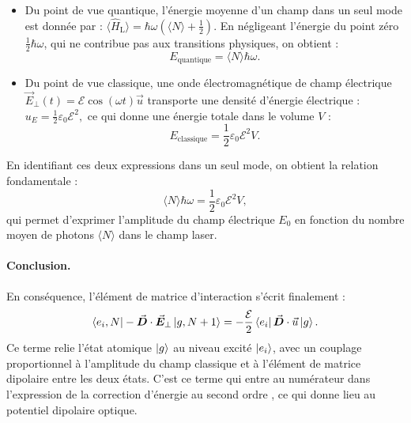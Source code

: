 \begin{itemize}[label = $\bullet$]
  \item Du point de vue quantique, l’énergie moyenne d’un champ dans un seul mode est donnée par :
  \(
  \langle \hat{H}_{\mathrm{L}} \rangle = \hbar \omega \left( \langle N \rangle + \frac{1}{2} \right).
  \)
  En négligeant l’énergie du point zéro \( \frac{1}{2} \hbar \omega \), qui ne contribue pas aux transitions physiques, on obtient :
  \[
  E_{\mathrm{quantique}} = \langle N \rangle \hbar \omega.
  \]

  \item Du point de vue classique, une onde électromagnétique de champ électrique \( \vec{E}_\perp(t) = \mathcal{E} \cos(\omega t) \vec{u} \) transporte une densité d’énergie électrique :
  \(
  u_E = \frac{1}{2} \varepsilon_0\mathcal{E}^2,
  \)
  ce qui donne une énergie totale dans le volume \( V \) :
  \[
  E_{\mathrm{classique}} = \frac{1}{2} \varepsilon_0 \mathcal{E}^2 V.
  \]
\end{itemize}

En identifiant ces deux expressions dans un seul mode, on obtient la relation fondamentale :
\[
\langle N \rangle \hbar \omega = \frac{1}{2} \varepsilon_0 \mathcal{E}^2 V,
\]
qui permet d’exprimer l’amplitude du champ électrique \( E_0 \) en fonction du nombre moyen de photons \( \langle N \rangle \) dans le champ laser.



\paragraph{Conclusion.} En conséquence, l’élément de matrice d’interaction s’écrit finalement :
\[
\bra{e_i, N} - \vec{{\bm{D}}} \cdot \vec{{\bm{E}}}_\perp \ket{g, N + 1} = - \frac{\mathcal{E}}{2} \bra{e_i} \vec{{\bm{D}}} \cdot \vec{u} \ket{g}.
\]
Ce terme relie l’état atomique \( \ket{g} \) au niveau excité \( \ket{e_i} \), avec un couplage proportionnel à l’amplitude du champ classique et à l’élément de matrice dipolaire entre les deux états. C’est ce terme qui entre au numérateur dans l’expression de la correction d’énergie au second ordre , ce qui donne lieu au potentiel dipolaire optique.\\

